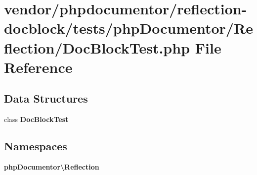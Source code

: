 \section{vendor/phpdocumentor/reflection-\/docblock/tests/php\+Documentor/\+Reflection/\+Doc\+Block\+Test.php File Reference}
\label{phpdocumentor_2reflection-docblock_2tests_2php_documentor_2_reflection_2_doc_block_test_8php}
\subsection*{Data Structures}
\begin{DoxyCompactItemize}
\item 
class {\bf Doc\+Block\+Test}
\end{DoxyCompactItemize}
\subsection*{Namespaces}
\begin{DoxyCompactItemize}
\item 
 {\bf php\+Documentor\textbackslash{}\+Reflection}
\end{DoxyCompactItemize}
